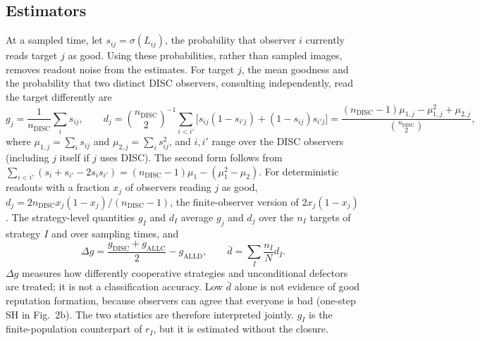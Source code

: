 \documentclass[fleqn,10pt]{article}
\theoremstyle{plain}
\theoremstyle{remark}
\newcommand{\FigRecognition}{2}
\newcommand{\ALLC}{\mathrm{ALLC}}
\newcommand{\ALLD}{\mathrm{ALLD}}
\newcommand{\DISC}{\mathrm{DISC}}
\begin{document}
\subsection{Estimators}
At a sampled time, let $s_{ij}=\sigma(L_{ij})$, the probability that observer $i$
currently reads target $j$ as good. Using these probabilities, rather than
sampled images, removes readout noise from the estimates. For target $j$, the
mean goodness and the probability that two distinct DISC observers, consulting
independently, read the target differently are
\begin{equation}
g_j=\frac{1}{n_{\DISC}}\sum_is_{ij},\qquad
d_j=\binom{n_{\DISC}}{2}^{-1}\sum_{i<i'}\bigl[s_{ij}(1-s_{i'j})+(1-s_{ij})s_{i'j}\bigr]
=\frac{(n_{\DISC}-1)\mu_{1,j}-\mu_{1,j}^2+\mu_{2,j}}{\binom{n_{\DISC}}{2}},
\label{eq:S-estimators}
\end{equation}
where $\mu_{1,j}=\sum_is_{ij}$ and $\mu_{2,j}=\sum_is_{ij}^2$, and $i,i'$ range over
the DISC observers (including $j$ itself if $j$ uses DISC). The second form
follows from $\sum_{i<i'}(s_i+s_{i'}-2s_is_{i'})=(n_{\DISC}-1)\mu_1-(\mu_1^2-\mu_2)$.
For deterministic readouts with a fraction $x_j$ of observers reading $j$ as
good, $d_j=2n_{\DISC}x_j(1-x_j)/(n_{\DISC}-1)$, the finite-observer version of
$2x_j(1-x_j)$. The strategy-level quantities $g_I$ and $d_I$ average $g_j$ and
$d_j$ over the $n_I$ targets of strategy $I$ and over sampling times, and
\begin{equation}
\Delta g=\frac{g_{\DISC}+g_{\ALLC}}{2}-g_{\ALLD},\qquad
\bar d=\sum_I\frac{n_I}{N}d_I .
\label{eq:S-recognition}
\end{equation}
$\Delta g$ measures how differently cooperative strategies and unconditional
defectors are treated; it is not a classification accuracy. Low $\bar d$ alone is
not evidence of good reputation formation, because observers can agree that
everyone is bad (one-step SH in Fig.~\FigRecognition b). The two statistics are
therefore interpreted jointly. $g_I$ is the finite-population counterpart of
$r_I$, but it is estimated without the closure.
\end{document}

